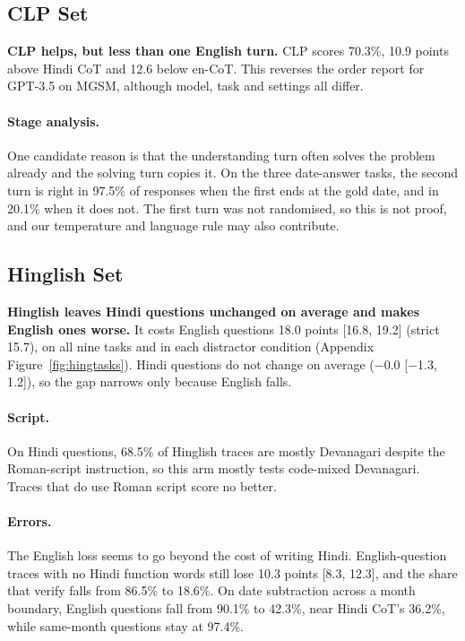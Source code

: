\documentclass[11pt]{article}
\begin{document}
\subsection{CLP Set}
\label{sec:clp}

\textbf{CLP helps, but less than one English turn.} CLP scores 70.3\%, 10.9 points above Hindi CoT and 12.6 below en-CoT. This reverses the order \citet{qin-etal-2023-cross} report for GPT-3.5 on MGSM, although model, task and settings all differ.

\paragraph{Stage analysis.}
One candidate reason is that the understanding turn often solves the problem already and the solving turn copies it. On the three date-answer tasks, the second turn is right in 97.5\% of responses when the first ends at the gold date, and in 20.1\% when it does not. The first turn was not randomised, so this is not proof, and our temperature and language rule may also contribute.

\subsection{Hinglish Set}
\label{sec:hinglish}

\textbf{Hinglish leaves Hindi questions unchanged on average and makes English ones worse.} It costs English questions 18.0 points [16.8, 19.2] (strict 15.7), on all nine tasks and in each distractor condition (Appendix Figure~\ref{fig:hingtasks}). Hindi questions do not change on average ($-$0.0 [$-$1.3, 1.2]), so the gap narrows only because English falls.

\paragraph{Script.}
On Hindi questions, 68.5\% of Hinglish traces are mostly Devanagari despite the Roman-script instruction, so this arm mostly tests code-mixed Devanagari. Traces that do use Roman script score no better.

\paragraph{Errors.}
The English loss seems to go beyond the cost of writing Hindi. English-question traces with no Hindi function words still lose 10.3 points [8.3, 12.3], and the share that verify falls from 86.5\% to 18.6\%. On date subtraction across a month boundary, English questions fall from 90.1\% to 42.3\%, near Hindi CoT's 36.2\%, while same-month questions stay at 97.4\%.
\end{document}
